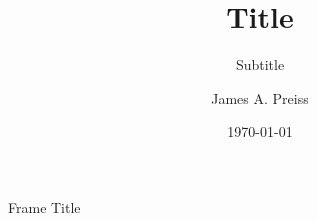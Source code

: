 \documentclass[aspectratio=149,xcolor={dvipsnames}]{beamer}
\title{Title}
\subtitle{Subtitle}
\author{James A. Preiss}
\institute{University of Southern California}
\date{\monthyear\today}
\begin{document}
\frame{\titlepage}

\begin{frame}{Frame Title}
\end{frame}
\end{document}
